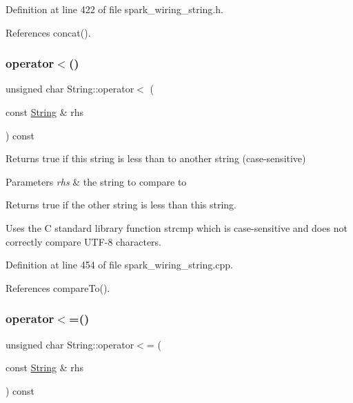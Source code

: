 Definition at line 422 of file spark\+\_\+wiring\+\_\+string.\+h.



References concat().

\mbox{\label{class_string_ae536c93957c3e2369a94bbdf99037681}} 
\subsubsection{\texorpdfstring{operator$<$()}{operator<()}}
{\footnotesize\ttfamily unsigned char String\+::operator$<$ (\begin{DoxyParamCaption}\item[{const \hyperlink{class_string}{String} \&}]{rhs }\end{DoxyParamCaption}) const}



Returns true if this string is less than to another string (case-\/sensitive) 


\begin{DoxyParams}{Parameters}
{\em rhs} & the string to compare to\\
\hline
\end{DoxyParams}
\begin{DoxyReturn}{Returns}
true if the other string is less than this string.
\end{DoxyReturn}
Uses the C standard library function strcmp which is case-\/sensitive and does not correctly compare U\+T\+F-\/8 characters. 

Definition at line 454 of file spark\+\_\+wiring\+\_\+string.\+cpp.



References compare\+To().

\mbox{\label{class_string_a111fa1bc3ab1c20223cc8940cd122278}} 
\subsubsection{\texorpdfstring{operator$<$=()}{operator<=()}}
{\footnotesize\ttfamily unsigned char String\+::operator$<$= (\begin{DoxyParamCaption}\item[{const \hyperlink{class_string}{String} \&}]{rhs }\end{DoxyParamCaption}) const}



